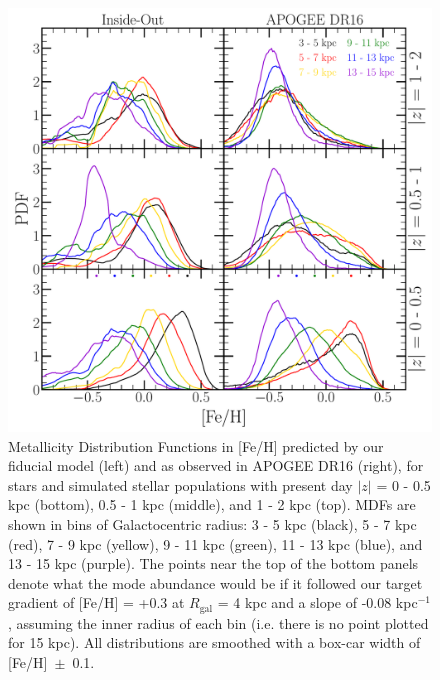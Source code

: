 \documentclass[fleqn, usenatbib]{mnras}
\begin{document}
\begin{figure} 
\centering 
\includegraphics[scale = 0.34]{mdf_3panel_fe.pdf} 
\caption{Metallicity Distribution Functions in [Fe/H] predicted by our 
fiducial model (left) and as observed in APOGEE DR16 (right), for stars and 
simulated stellar populations with present day $\left|z\right|$ = 0 - 0.5 kpc 
(bottom), 0.5 - 1 kpc (middle), and 1 - 2 kpc (top). MDFs are shown in bins 
of Galactocentric radius: 3 - 5 kpc (black), 5 - 7 kpc (red), 7 - 9 kpc 
(yellow), 9 - 11 kpc (green), 11 - 13 kpc (blue), and 13 - 15 kpc (purple). 
The points near the top of the bottom panels denote what the mode abundance 
would be if it followed our target gradient of [Fe/H] = +0.3 at $R_\text{gal}$ 
= 4 kpc and a slope of -0.08 kpc$^{-1}$, assuming the inner radius of each bin 
(i.e. there is no point plotted for 15 kpc). All distributions are smoothed 
with a box-car width of [Fe/H]~$\pm$~0.1. } 
\label{fig:mdf_3panel_fe} 
\end{figure} 
\end{document}
